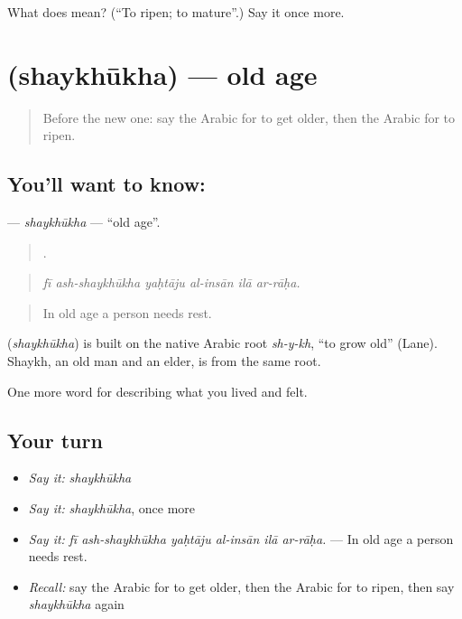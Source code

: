 \begin{tcolorbox}[breakable,colback=teal!4,colframe=teal!35!black,title={Before you move on}]
What does  mean? (\textquotedblleft{}To ripen; to mature\textquotedblright{}.) Say it once more.
\end{tcolorbox}
\section[\texorpdfstring{\ar{شيخوخة} (shaykhūkha)}{شيخوخة (shaykhūkha)}]{ (shaykhūkha) — old age}

\label{lesson:AR-C531-shaykhukha}



\begin{quote}
Before the new one: say the Arabic for to get older, then the Arabic for to ripen.
\end{quote}

\subsection*{You'll want to know: }
\textbf{} — \emph{shaykhūkha} — \textquotedblleft{}old age\textquotedblright{}.

\begin{quote}
     .
\end{quote}

\begin{quote}
\emph{fī ash-shaykhūkha yaḥtāju al-insān ilā ar-rāḥa.}
\end{quote}

\begin{quote}
In old age a person needs rest.
\end{quote}

\begin{cousinweb}
\textbf{} (\emph{shaykhūkha}) is built on the native Arabic root \emph{sh-y-kh}, \textquotedblleft{}to grow old\textquotedblright{} (Lane). Shaykh, an old man and an elder, is from the same root.
\end{cousinweb}

\begin{grammarlens}[title={What you've built}]
One more word for describing what you lived and felt.
\end{grammarlens}

\subsection*{Your turn}
\begin{itemize}
\raggedright
  \item \emph{Say it:} \emph{shaykhūkha}
  \item \emph{Say it:} \emph{shaykhūkha}, once more
  \item \emph{Say it:} \emph{fī ash-shaykhūkha yaḥtāju al-insān ilā ar-rāḥa.} — In old age a person needs rest.
  \item \emph{Recall:} say the Arabic for to get older, then the Arabic for to ripen, then say \emph{shaykhūkha} again
\end{itemize}

